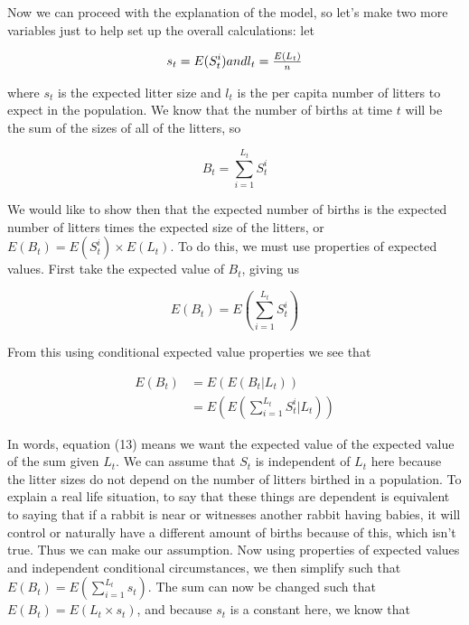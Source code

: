 \documentclass[titlepage]{article}\usepackage[]{graphicx}\usepackage[]{color}
\begin{document}
Now we can proceed with the explanation of the model, so let's make two more variables just to help set up the overall calculations: let 

\begin{equation}
s_t = E(S_t^i)$$ and $$l_t = \frac{E(L_t)}{n}
\end{equation}

\noindent where \(s_t\) is the expected litter size and \(l_t\) is the per capita number of litters to expect in the population. We know that the number of births at time \(t\) will be the sum of the sizes of all of the litters, so 

\begin{equation}
B_t = \sum_{i=1}^{L_t} S_t^i 
\end{equation}

We would like to show then that the expected number of births is the expected number of litters times the expected size of the litters, or \(E(B_t) = E(S_t^i)\times E(L_t)\). To do this, we must use properties of expected values. First take the expected value of \(B_t\), giving us 

\begin{equation}
E(B_t) = E\left(\sum_{i=1}^{L_t} S_t^i\right)
\end{equation}

\noindent From this using conditional expected value properties we see that 

\begin{equation}
\begin{split}
E(B_t) & = E(E(B_t | L_t)) \\
& = E\left(E\left(\sum_{i=1}^{L_t} S_t^i | L_t\right)\right)
\end{split}
\end{equation}

\noindent In words, equation (13) means we want the expected value of the expected value of the sum given \(L_t\). We can assume that \(S_t\) is independent of \(L_t\) here because the litter sizes do not depend on the number of litters birthed in a population. To explain a real life situation, to say that these things are dependent is equivalent to saying that if a rabbit is near or witnesses another rabbit having babies, it will control or naturally have a different amount of births because of this, which isn't true. Thus we can make our assumption. Now using properties of expected values and independent conditional circumstances, we then simplify such that \(E(B_t) = E(\sum_{i=1}^{L_t} s_t)\). The sum can now be changed such that \(E(B_t) = E(L_t \times s_t)\), and because \(s_t\) is a constant here, we know that 
\end{document}
